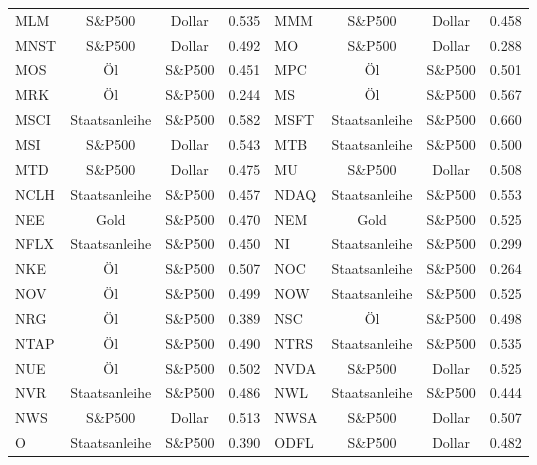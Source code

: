\begin{longtable}{l c c c | l c c c}
    MLM    & S\&P500       & Dollar    & 0.535         & MMM    & S\&P500       & Dollar    & 0.458         \\
    MNST   & S\&P500       & Dollar    & 0.492         & MO     & S\&P500       & Dollar    & 0.288         \\
    MOS    & Öl            & S\&P500   & 0.451         & MPC    & Öl            & S\&P500   & 0.501         \\
    MRK    & Öl            & S\&P500   & 0.244         & MS     & Öl            & S\&P500   & 0.567         \\
    MSCI   & Staatsanleihe & S\&P500   & 0.582         & MSFT   & Staatsanleihe & S\&P500   & 0.660         \\
    MSI    & S\&P500       & Dollar    & 0.543         & MTB    & Staatsanleihe & S\&P500   & 0.500         \\
    MTD    & S\&P500       & Dollar    & 0.475         & MU     & S\&P500       & Dollar    & 0.508         \\
    NCLH   & Staatsanleihe & S\&P500   & 0.457         & NDAQ   & Staatsanleihe & S\&P500   & 0.553         \\
    NEE    & Gold          & S\&P500   & 0.470         & NEM    & Gold          & S\&P500   & 0.525         \\
    NFLX   & Staatsanleihe & S\&P500   & 0.450         & NI     & Staatsanleihe & S\&P500   & 0.299         \\
    NKE    & Öl            & S\&P500   & 0.507         & NOC    & Staatsanleihe & S\&P500   & 0.264         \\
    NOV    & Öl            & S\&P500   & 0.499         & NOW    & Staatsanleihe & S\&P500   & 0.525         \\
    NRG    & Öl            & S\&P500   & 0.389         & NSC    & Öl            & S\&P500   & 0.498         \\
    NTAP   & Öl            & S\&P500   & 0.490         & NTRS   & Staatsanleihe & S\&P500   & 0.535         \\
    NUE    & Öl            & S\&P500   & 0.502         & NVDA   & S\&P500       & Dollar    & 0.525         \\
    NVR    & Staatsanleihe & S\&P500   & 0.486         & NWL    & Staatsanleihe & S\&P500   & 0.444         \\
    NWS    & S\&P500       & Dollar    & 0.513         & NWSA   & S\&P500       & Dollar    & 0.507         \\
    O      & Staatsanleihe & S\&P500   & 0.390         & ODFL   & S\&P500       & Dollar    & 0.482         \\

\end{longtable}
